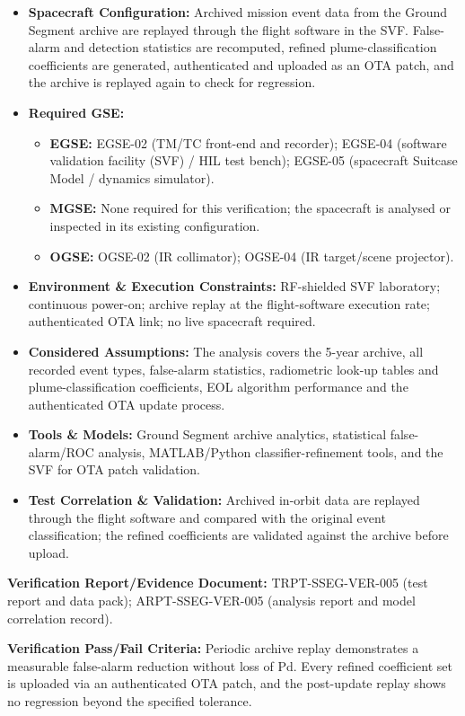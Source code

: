\begin{itemize}
\item \textbf{Spacecraft Configuration:} Archived mission event data from the Ground Segment archive are replayed through the flight software in the SVF. False-alarm and detection statistics are recomputed, refined plume-classification coefficients are generated, authenticated and uploaded as an OTA patch, and the archive is replayed again to check for regression.
\item \textbf{Required GSE:}
\begin{itemize}
\item \textbf{EGSE:} EGSE-02 (TM/TC front-end and recorder); EGSE-04 (software validation facility (SVF) / HIL test bench); EGSE-05 (spacecraft Suitcase Model / dynamics simulator).
\item \textbf{MGSE:} None required for this verification; the spacecraft is analysed or inspected in its existing configuration.
\item \textbf{OGSE:} OGSE-02 (IR collimator); OGSE-04 (IR target/scene projector).
\end{itemize}
\item \textbf{Environment \& Execution Constraints:} RF-shielded SVF laboratory; continuous power-on; archive replay at the flight-software execution rate; authenticated OTA link; no live spacecraft required.
\item \textbf{Considered Assumptions:} The analysis covers the 5-year archive, all recorded event types, false-alarm statistics, radiometric look-up tables and plume-classification coefficients, EOL algorithm performance and the authenticated OTA update process.
\item \textbf{Tools \& Models:} Ground Segment archive analytics, statistical false-alarm/ROC analysis, MATLAB/Python classifier-refinement tools, and the SVF for OTA patch validation.
\item \textbf{Test Correlation \& Validation:} Archived in-orbit data are replayed through the flight software and compared with the original event classification; the refined coefficients are validated against the archive before upload.
\end{itemize}
\par\textbf{Verification Report/Evidence Document:} TRPT-SSEG-VER-005 (test report and data pack); ARPT-SSEG-VER-005 (analysis report and model correlation record).
\par\textbf{Verification Pass/Fail Criteria:} Periodic archive replay demonstrates a measurable false-alarm reduction without loss of Pd. Every refined coefficient set is uploaded via an authenticated OTA patch, and the post-update replay shows no regression beyond the specified tolerance.
\par\medskip


